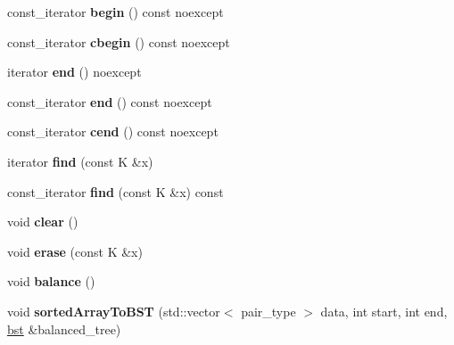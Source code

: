 \begin{DoxyCompactItemize}
\mbox{\label{classBST_1_1bst_a09b9837132cc0a911be4409bab8ab56f}} 
const\+\_\+iterator {\bfseries begin} () const noexcept
\item 
\mbox{\label{classBST_1_1bst_aeb386c648e83761a52fe4ff1ac493463}} 
const\+\_\+iterator {\bfseries cbegin} () const noexcept
\item 
\mbox{\label{classBST_1_1bst_a3620e47dedded6930a8b0488fe6ced6b}} 
iterator {\bfseries end} () noexcept
\item 
\mbox{\label{classBST_1_1bst_acd7c23bcd5cf4f947ce2c0ac88fe646b}} 
const\+\_\+iterator {\bfseries end} () const noexcept
\item 
\mbox{\label{classBST_1_1bst_a17559d18bdbc5db5b77537a7044e449d}} 
const\+\_\+iterator {\bfseries cend} () const noexcept
\item 
\mbox{\label{classBST_1_1bst_a35880bb25ce5fbe2a10ce004b33cd5f2}} 
iterator {\bfseries find} (const K \&x)
\item 
\mbox{\label{classBST_1_1bst_a5c0e2b56c838441ec33d29c0184b941b}} 
const\+\_\+iterator {\bfseries find} (const K \&x) const
\item 
\mbox{\label{classBST_1_1bst_a25224d3f487fe02a1be8767e4fc3b8fd}} 
void {\bfseries clear} ()
\item 
\mbox{\label{classBST_1_1bst_a6cd8cd1e40106c21145ae0949159bd34}} 
void {\bfseries erase} (const K \&x)
\item 
\mbox{\label{classBST_1_1bst_af4df6a5c2ae79c5133688b3e117d622b}} 
void {\bfseries balance} ()
\item 
\mbox{\label{classBST_1_1bst_a6e73f752cee124c1421fb32a6a6b4c8f}} 
void {\bfseries sorted\+Array\+To\+B\+ST} (std\+::vector$<$ pair\+\_\+type $>$ data, int start, int end, \hyperlink{classBST_1_1bst}{bst} \&balanced\+\_\+tree)
\item 
\mbox{\label{classBST_1_1bst_a4d960d28e5384f9cfc834f68405047da}} 

\end{DoxyCompactItemize}
